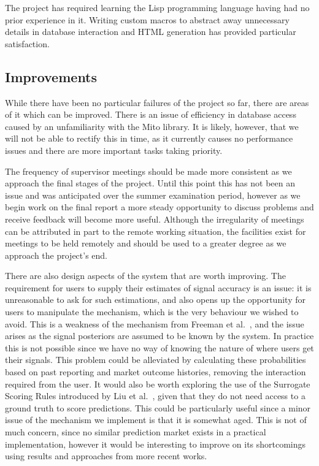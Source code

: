 \documentclass[10pt,a4paper]{article}
\theoremstyle{plain}
\theoremstyle{definition}
\begin{document}
The project has required learning the Lisp programming language having had no
prior experience in it. Writing custom macros to abstract away unnecessary
details in database interaction and HTML generation has provided particular
satisfaction.

\subsection{Improvements}

While there have been no particular failures of the project so far, there are
areas of it which can be improved. There is an issue of efficiency in database
access caused by an unfamiliarity with the Mito library. It is likely, however,
that we will not be able to rectify this in time, as it currently causes no
performance issues and there are more important tasks taking priority.

The frequency of supervisor meetings should be made more consistent as we
approach the final stages of the project. Until this point this has not been an
issue and was anticipated over the summer examination period, however as we
begin work on the final report a more steady opportunity to discuss problems
and receive feedback will become more useful. Although the irregularity of
meetings can be attributed in part to the remote working situation, the
facilities exist for meetings to be held remotely and should be used to a
greater degree as we approach the project's end.

There are also design aspects of the system that are worth improving. The
requirement for users to supply their estimates of signal accuracy is an issue:
it is unreasonable to ask for such estimations, and also opens up the
opportunity for users to manipulate the mechanism, which is the very behaviour
we wished to avoid. This is a weakness of the mechanism from Freeman et
al.~\cite{CODiPM}, and the issue arises as the signal posteriors are assumed to
be known by the system. In practice this is not possible since we have no way
of knowing the nature of where users get their signals. This problem could be
alleviated by calculating these probabilities based on past reporting and
market outcome histories, removing the interaction required from the user. It
would also be worth exploring the use of the Surrogate Scoring Rules introduced
by Liu et al.~\cite{Liu2020}, given that they do not need access to a ground
truth to score predictions. This could be particularly useful since a minor
issue of the mechanism we implement is that it is somewhat aged. This is not of
much concern, since no similar prediction market exists in a practical
implementation, however it would be interesting to improve on its shortcomings
using results and approaches from more recent works.
\end{document}

